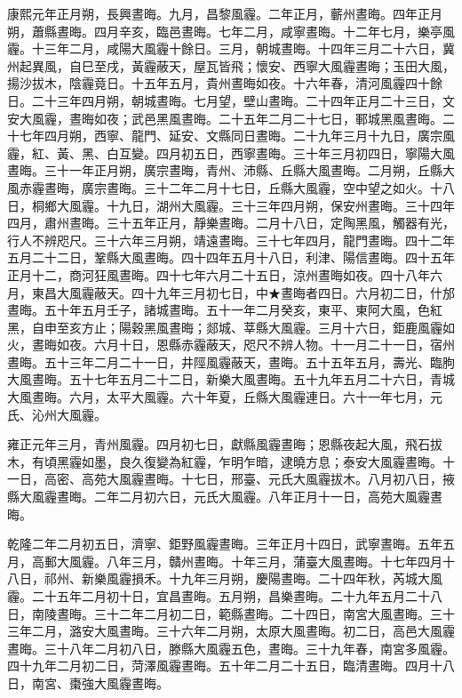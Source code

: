 \begin{pinyinscope}
康熙元年正月朔，長興晝晦。九月，昌黎風霾。二年正月，蘄州晝晦。四年正月朔，蕭縣晝晦。四月辛亥，臨邑晝晦。七年二月，咸寧晝晦。十二年七月，樂亭風霾。十三年二月，咸陽大風霾十餘日。三月，朝城晝晦。十四年三月二十六日，冀州起異風，自巳至戌，黃霾蔽天，屋瓦皆飛；懷安、西寧大風霾晝晦；玉田大風，揚沙拔木，陰霾竟日。十五年五月，貴州晝晦如夜。十六年春，清河風霾四十餘日。二十三年四月朔，朝城晝晦。七月望，壁山晝晦。二十四年正月二十三日，文安大風霾，晝晦如夜；武邑黑風晝晦。二十五年二月二十七日，鄆城黑風晝晦。二十七年四月朔，西寧、龍門、延安、文縣同日晝晦。二十九年三月十九日，廣宗風霾，紅、黃、黑、白互變。四月初五日，西寧晝晦。三十年三月初四日，寧陽大風晝晦。三十一年正月朔，廣宗晝晦，青州、沛縣、丘縣大風晝晦。二月朔，丘縣大風赤霾晝晦，廣宗晝晦。三十二年二月十七日，丘縣大風霾，空中望之如火。十八日，桐鄉大風霾。十九日，湖州大風霾。三十三年四月朔，保安州晝晦。三十四年四月，肅州晝晦。三十五年正月，靜樂晝晦。二月十八日，定陶黑風，觸器有光，行人不辨咫尺。三十六年三月朔，靖遠晝晦。三十七年四月，龍門晝晦。四十二年五月二十二日，鞏縣大風晝晦。四十四年五月十八日，利津、陽信晝晦。四十五年正月十二，商河狂風晝晦。四十七年六月二十五日，涼州晝晦如夜。四十八年六月，東昌大風霾蔽天。四十九年三月初七日，中★晝晦者四日。六月初二日，什邡晝晦。五十年五月壬子，諸城晝晦。五十一年二月癸亥，東平、東阿大風，色紅黑，自申至亥方止；陽穀黑風晝晦；郯城、莘縣大風霾。三月十六日，鉅鹿風霾如火，晝晦如夜。六月十日，恩縣赤霾蔽天，咫尺不辨人物。十一月二十一日，宿州晝晦。五十三年二月二十一日，井陘風霾蔽天，晝晦。五十五年五月，壽光、臨朐大風晝晦。五十七年五月二十二日，新樂大風晝晦。五十九年五月二十六日，青城大風晝晦。六月，太平大風霾。六十年夏，丘縣大風霾連日。六十一年七月，元氏、沁州大風霾。

雍正元年三月，青州風霾。四月初七日，獻縣風霾晝晦；恩縣夜起大風，飛石拔木，有頃黑霾如墨，良久復變為紅霾，乍明乍暗，逮曉方息；泰安大風霾晝晦。十一日，高密、高苑大風霾晝晦。十七日，邢臺、元氏大風霾拔木。八月初八日，掖縣大風霾晝晦。二年二月初六日，元氏大風霾。八年正月十一日，高苑大風霾晝晦。

乾隆二年二月初五日，濟寧、鉅野風霾晝晦。三年正月十四日，武寧晝晦。五年五月，高郵大風霾。八年三月，贛州晝晦。十年三月，蒲臺大風晝晦。十七年四月十八日，祁州、新樂風霾損禾。十九年三月朔，慶陽晝晦。二十四年秋，芮城大風霾。二十五年二月初十日，宜昌晝晦。五月朔，昌樂晝晦。二十九年五月二十八日，南陵晝晦。三十二年二月初二日，範縣晝晦。二十四日，南宮大風晝晦。三十三年二月，潞安大風晝晦。三十六年二月朔，太原大風晝晦。初二日，高邑大風霾晝晦。三十八年二月初八日，滕縣大風霾五色，晝晦。三十九年春，南宮多風霾。四十九年二月初二日，菏澤風霾晝晦。五十年二月二十五日，臨清晝晦。四月十八日，南宮、棗強大風霾晝晦。


\end{pinyinscope}
